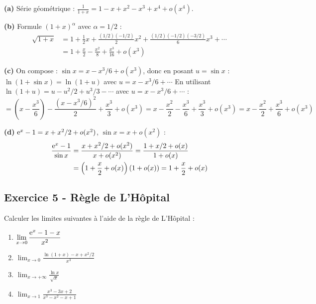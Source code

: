 \documentclass[12pt,a4paper]{article}
\begin{document}
\begin{boitecorrige}
\textbf{(a)} Série géométrique : $\frac{1}{1+x} = 1-x+x^2-x^3+x^4+o(x^4)$.

\textbf{(b)} Formule $(1+x)^\alpha$ avec $\alpha=1/2$ :
\begin{align*}
\sqrt{1+x} &= 1+\frac{1}{2}x+\frac{(1/2)(-1/2)}{2}x^2+\frac{(1/2)(-1/2)(-3/2)}{6}x^3+\cdots \\
&= 1+\frac{x}{2}-\frac{x^2}{8}+\frac{x^3}{16}+o(x^3)
\end{align*}

\textbf{(c)} On compose : $\sin x = x - x^3/6 + o(x^3)$, donc en posant $u = \sin x$ :
$\ln(1+\sin x) = \ln(1+u)$ avec $u=x-x^3/6+\cdots$
En utilisant $\ln(1+u)=u-u^2/2+u^3/3-\cdots$ avec $u=x-x^3/6+\cdots$ :
\[
= \left(x-\frac{x^3}{6}\right) - \frac{(x-x^3/6)^2}{2}+\frac{x^3}{3}+o(x^3)
= x - \frac{x^2}{2} - \frac{x^3}{6} + \frac{x^3}{3} + o(x^3)
= x - \frac{x^2}{2} + \frac{x^3}{6} + o(x^3)
\]

\textbf{(d)} $\mathrm{e}^x-1 = x+x^2/2+o(x^2)$, $\sin x = x+o(x^2)$ :
\begin{align*}
\frac{\mathrm{e}^x-1}{\sin x} &= \frac{x+x^2/2+o(x^2)}{x+o(x^2)} = \frac{1+x/2+o(x)}{1+o(x)} \\
&= \left(1+\frac{x}{2}+o(x)\right)(1+o(x)) = 1+\frac{x}{2}+o(x)
\end{align*}
\end{boitecorrige}

\subsection*{Exercice 5 - Règle de L'Hôpital \niveau{\moyen}}

\begin{boiteexercice}
Calculer les limites suivantes à l'aide de la règle de L'Hôpital :
\begin{enumerate}[label=(\alph*)]
  \item $\displaystyle\lim_{x\to0}\frac{\mathrm{e}^x-1-x}{x^2}$
  \item $\displaystyle\lim_{x\to0}\frac{\ln(1+x)-x+x^2/2}{x^3}$
  \item $\displaystyle\lim_{x\to+\infty}\frac{\ln x}{\sqrt{x}}$
  \item $\displaystyle\lim_{x\to1}\frac{x^3-3x+2}{x^3-x^2-x+1}$
\end{enumerate}
\end{boiteexercice}
\end{document}
